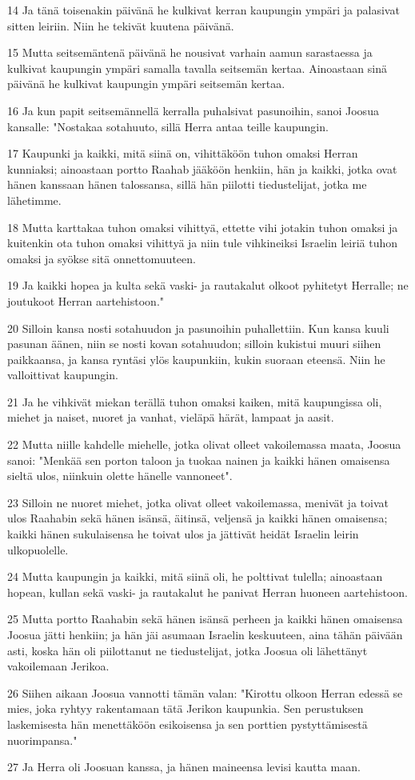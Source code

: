 \par 14 Ja tänä toisenakin päivänä he kulkivat kerran kaupungin ympäri ja palasivat sitten leiriin. Niin he tekivät kuutena päivänä.
\par 15 Mutta seitsemäntenä päivänä he nousivat varhain aamun sarastaessa ja kulkivat kaupungin ympäri samalla tavalla seitsemän kertaa. Ainoastaan sinä päivänä he kulkivat kaupungin ympäri seitsemän kertaa.
\par 16 Ja kun papit seitsemännellä kerralla puhalsivat pasunoihin, sanoi Joosua kansalle: "Nostakaa sotahuuto, sillä Herra antaa teille kaupungin.
\par 17 Kaupunki ja kaikki, mitä siinä on, vihittäköön tuhon omaksi Herran kunniaksi; ainoastaan portto Raahab jääköön henkiin, hän ja kaikki, jotka ovat hänen kanssaan hänen talossansa, sillä hän piilotti tiedustelijat, jotka me lähetimme.
\par 18 Mutta karttakaa tuhon omaksi vihittyä, ettette vihi jotakin tuhon omaksi ja kuitenkin ota tuhon omaksi vihittyä ja niin tule vihkineiksi Israelin leiriä tuhon omaksi ja syökse sitä onnettomuuteen.
\par 19 Ja kaikki hopea ja kulta sekä vaski- ja rautakalut olkoot pyhitetyt Herralle; ne joutukoot Herran aartehistoon."
\par 20 Silloin kansa nosti sotahuudon ja pasunoihin puhallettiin. Kun kansa kuuli pasunan äänen, niin se nosti kovan sotahuudon; silloin kukistui muuri siihen paikkaansa, ja kansa ryntäsi ylös kaupunkiin, kukin suoraan eteensä. Niin he valloittivat kaupungin.
\par 21 Ja he vihkivät miekan terällä tuhon omaksi kaiken, mitä kaupungissa oli, miehet ja naiset, nuoret ja vanhat, vieläpä härät, lampaat ja aasit.
\par 22 Mutta niille kahdelle miehelle, jotka olivat olleet vakoilemassa maata, Joosua sanoi: "Menkää sen porton taloon ja tuokaa nainen ja kaikki hänen omaisensa sieltä ulos, niinkuin olette hänelle vannoneet".
\par 23 Silloin ne nuoret miehet, jotka olivat olleet vakoilemassa, menivät ja toivat ulos Raahabin sekä hänen isänsä, äitinsä, veljensä ja kaikki hänen omaisensa; kaikki hänen sukulaisensa he toivat ulos ja jättivät heidät Israelin leirin ulkopuolelle.
\par 24 Mutta kaupungin ja kaikki, mitä siinä oli, he polttivat tulella; ainoastaan hopean, kullan sekä vaski- ja rautakalut he panivat Herran huoneen aartehistoon.
\par 25 Mutta portto Raahabin sekä hänen isänsä perheen ja kaikki hänen omaisensa Joosua jätti henkiin; ja hän jäi asumaan Israelin keskuuteen, aina tähän päivään asti, koska hän oli piilottanut ne tiedustelijat, jotka Joosua oli lähettänyt vakoilemaan Jerikoa.
\par 26 Siihen aikaan Joosua vannotti tämän valan: "Kirottu olkoon Herran edessä se mies, joka ryhtyy rakentamaan tätä Jerikon kaupunkia. Sen perustuksen laskemisesta hän menettäköön esikoisensa ja sen porttien pystyttämisestä nuorimpansa."
\par 27 Ja Herra oli Joosuan kanssa, ja hänen maineensa levisi kautta maan.

